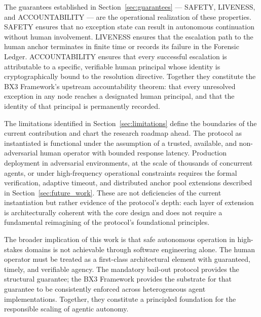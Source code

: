 The guarantees established in Section~\ref{sec:guarantees} --- SAFETY, LIVENESS,
and ACCOUNTABILITY --- are the operational realization of these properties.
SAFETY ensures that no exception state can result in autonomous continuation
without human involvement.  LIVENESS ensures that the escalation path to the
human anchor terminates in finite time or records its failure in the Forensic
Ledger.  ACCOUNTABILITY ensures that every successful escalation is attributable
to a specific, verifiable human principal whose identity is cryptographically
bound to the resolution directive.  Together they constitute the BX3 Framework's
upstream accountability theorem: that every unresolved exception in any node
reaches a designated human principal, and that the identity of that principal is
permanently recorded.

The limitations identified in Section~\ref{sec:limitations} define the boundaries
of the current contribution and chart the research roadmap ahead.  The protocol as
instantiated is functional under the assumption of a trusted, available, and
non-adversarial human operator with bounded response latency.  Production
deployment in adversarial environments, at the scale of thousands of concurrent
agents, or under high-frequency operational constraints requires the formal
verification, adaptive timeout, and distributed anchor pool extensions described
in Section~\ref{sec:future_work}.  These are not deficiencies of the current
instantiation but rather evidence of the protocol's depth: each layer of extension
is architecturally coherent with the core design and does not require a fundamental
reimagining of the protocol's foundational principles.

The broader implication of this work is that safe autonomous operation in
high-stakes domains is not achievable through software engineering alone.  The
human operator must be treated as a first-class architectural element with
guaranteed, timely, and verifiable agency.  The mandatory bail-out protocol
provides the structural guarantee; the BX3 Framework provides the substrate for
that guarantee to be consistently enforced across heterogeneous agent
implementations.  Together, they constitute a principled foundation for the
responsible scaling of agentic autonomy.
